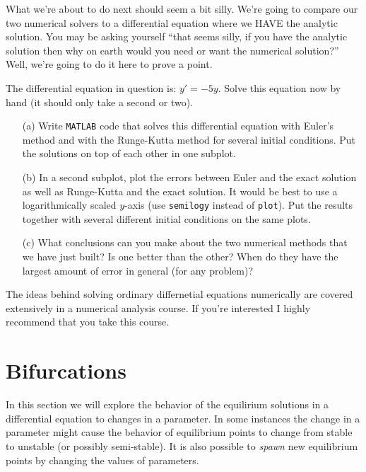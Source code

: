 What we're about to do next should seem a bit silly.  We're going to compare our two
numerical solvers to a differential equation where we HAVE the analytic solution.  You may
be asking yourself ``that seems silly, if you have the analytic solution then why on earth
would you need or want the numerical solution?''  Well, we're going to do it here to prove
a point.  

\begin{problem}
The differential equation in question is: $y' = -5y$.  Solve this equation now by hand (it
should only take a second or two).
\begin{enumerate}
    \item[(a)] Write \texttt{MATLAB} code that solves this differential equation with Euler's
        method and with the Runge-Kutta method for several initial conditions.  Put the
        solutions on top of each other in one subplot.
    \item[(b)] In a second subplot, plot the errors between Euler and the exact solution as
        well as Runge-Kutta and the exact solution.  It would be best to use a
        logarithmically scaled $y$-axis (use \texttt{semilogy} instead of \texttt{plot}).
        Put the results together with several different initial conditions on the same
        plots.
    \item[(c)] What conclusions can you make about the two numerical methods that we have just
        built?  Is one better than the other?  When do they have the largest amount of
        error in general (for any problem)?
\end{enumerate}
\end{problem}

The ideas behind solving ordinary differnetial equations numerically are covered
extensively in a numerical analysis course.  If you're interested I highly recommend that
you take this course.




\newpage\section{Bifurcations}
In this section we will explore the behavior of the equilirium solutions in a differential
equation to changes in a parameter.  In some instances the change in a parameter might
cause the behavior of equilibrium points to change from stable to unstable (or possibly
semi-stable).  It is also possible to {\it spawn} new equilibrium points by changing the
values of parameters. 

